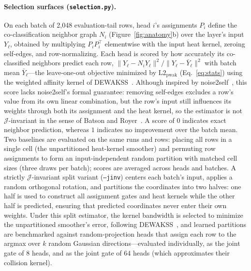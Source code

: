 \paragraph{Selection surfaces (\texttt{selection.py}).}
On each batch of 2{,}048 evaluation-tail rows, head $i$'s assignments $P_i$
define the co-classification neighbor graph $N_i$ (Figure~\ref{fig:anatomy}b)
over the layer's input $Y_\ell$, obtained by multiplying $P_iP_i^\top$
elementwise with the input heat kernel, zeroing self-edges, and
row-normalizing. Each head is scored by how accurately its co-classified
neighbors predict each row,
$\lVert Y_\ell - N_iY_\ell\rVert^2/\lVert Y_\ell - \bar{Y}_\ell\rVert^2$
with batch mean $\bar{Y}_\ell$---the leave-one-out objective minimized by
$\mathrm{L2}_{\mathrm{pwak}}$ (Eq.~\eqref{eq:stats}) using the weighted
affinity kernel of DEWAKSS~\cite{tjarnberg2021}. Although inspired by
noise2self~\cite{batson2019}, this score lacks noise2self's formal
guarantee: removing self-edges excludes a row's value from its own linear
combination, but the row's input still influences its weights through both
its assignment and the heat kernel, so the estimator is not
$\mathcal{J}$-invariant in the sense of Batson and Royer~\cite{batson2019}.
A score of $0$ indicates exact neighbor prediction, whereas $1$ indicates
no improvement over the batch mean. Two baselines are evaluated on the same
runs and rows: placing all rows in a single cell (the unpartitioned
heat-kernel smoother) and permuting row assignments to form an
input-independent random partition with matched cell sizes (three draws per
batch); scores are averaged across heads and batches. A strictly
$\mathcal{J}$-invariant split variant (\texttt{--jinv}) centers each
batch's input, applies a random orthogonal rotation, and partitions the
coordinates into two halves: one half is used to construct all assignment
gates and heat kernels while the other half is predicted, ensuring that
predicted coordinates never enter their own weights. Under this split
estimator, the kernel bandwidth is selected to minimize the unpartitioned
smoother's error, following DEWAKSS~\cite{tjarnberg2021}, and learned
partitions are benchmarked against random-projection heads that assign each
row to the argmax over $k$ random Gaussian directions---evaluated
individually, as the joint gate of $8$ heads, and as the joint gate of $64$
heads (which approximates their collision kernel).

